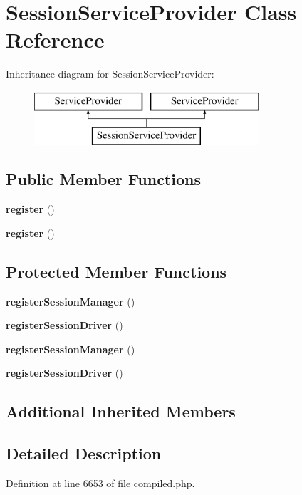 \section{Session\+Service\+Provider Class Reference}
\label{class_illuminate_1_1_session_1_1_session_service_provider}
Inheritance diagram for Session\+Service\+Provider\+:\begin{figure}[H]
\begin{center}
\leavevmode
\includegraphics[height=2.000000cm]{class_illuminate_1_1_session_1_1_session_service_provider}
\end{center}
\end{figure}
\subsection*{Public Member Functions}
\begin{DoxyCompactItemize}
\item 
{\bf register} ()
\item 
{\bf register} ()
\end{DoxyCompactItemize}
\subsection*{Protected Member Functions}
\begin{DoxyCompactItemize}
\item 
{\bf register\+Session\+Manager} ()
\item 
{\bf register\+Session\+Driver} ()
\item 
{\bf register\+Session\+Manager} ()
\item 
{\bf register\+Session\+Driver} ()
\end{DoxyCompactItemize}
\subsection*{Additional Inherited Members}


\subsection{Detailed Description}


Definition at line 6653 of file compiled.\+php.



